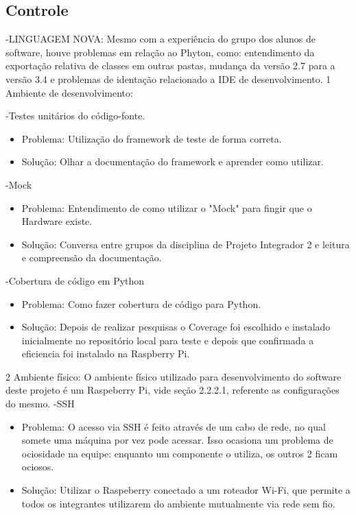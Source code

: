 \subsection{Controle}

-LINGUAGEM NOVA: Mesmo com a experiência do grupo dos alunos de software, houve problemas em relação ao Phyton, como: entendimento da exportação relativa de classes em outras pastas, mudança da versão 2.7 para a versão 3.4 e problemas de identação relacionado a IDE de desenvolvimento.
1 Ambiente de desenvolvimento:

-Testes unitários do código-fonte.
    \begin{itemize}
      \item Problema: Utilização do framework de teste de forma correta.
	  \item Solução: Olhar a documentação do framework e aprender como utilizar.

    \end{itemize}

-Mock
 \begin{itemize}
      \item Problema: Entendimento de como utilizar o "Mock" para fingir que o Hardware existe.
	  \item Solução: Conversa entre grupos da disciplina de Projeto Integrador 2 e leitura e compreensão da documentação.

    \end{itemize}

-Cobertura de código em Python
 \begin{itemize}
      \item Problema: Como fazer cobertura de código para Python.
	  \item Solução: Depois de realizar pesquisas o Coverage foi escolhido e instalado inicialmente no repositório local para teste e depois que confirmada a eficiencia foi instalado na Raspberry Pi.
    \end{itemize}

2 Ambiente físico: O ambiente físico utilizado para desenvolvimento do software deste projeto é um Raspeberry Pi, vide seção 2.2.2.1, referente as configurações do mesmo.
-SSH
 \begin{itemize}
      \item Problema:  O acesso via SSH é feito através de um cabo de rede, no qual somete uma máquina por vez pode acessar. Isso ocasiona um problema de ociosidade na equipe: enquanto um componente o utiliza, os outros 2 ficam ociosos.
	  \item Solução: Utilizar o Raspeberry conectado a um roteador Wi-Fi, que permite a todos os integrantes utilizarem do ambiente mutualmente via rede sem fio.
    \end{itemize}


